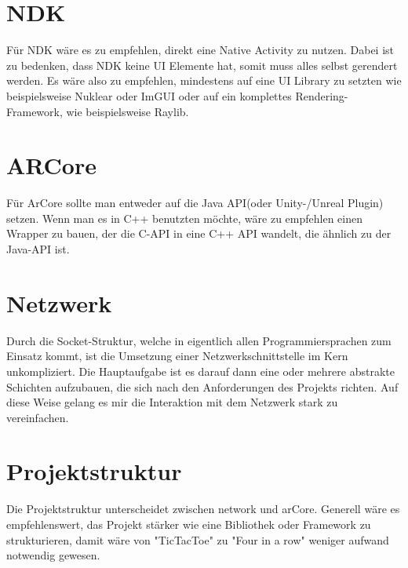 \section{NDK}
Für NDK wäre es zu empfehlen, direkt eine Native Activity zu nutzen.
Dabei ist zu bedenken, dass NDK keine UI Elemente hat, somit muss alles selbst
gerendert werden. Es wäre also zu empfehlen, mindestens auf eine UI Library zu setzten
wie beispielsweise Nuklear oder ImGUI oder auf ein komplettes Rendering-Framework,
wie beispielsweise Raylib.

\section{ARCore}
Für ArCore sollte man entweder auf die Java API(oder Unity-/Unreal Plugin) setzen.
Wenn man es in C++ benutzten möchte, wäre zu empfehlen einen Wrapper zu bauen, der die
C-API in eine C++ API wandelt, die ähnlich zu der Java-API ist.

\section{Netzwerk}
Durch die Socket-Struktur, welche in eigentlich allen Programmiersprachen zum Einsatz kommt,
ist die Umsetzung einer Netzwerkschnittstelle im Kern unkompliziert. Die Hauptaufgabe ist es darauf
dann eine oder mehrere abstrakte Schichten aufzubauen, die sich nach den Anforderungen des Projekts
richten. Auf diese Weise gelang es mir die Interaktion mit dem Netzwerk stark zu vereinfachen.

\section{Projektstruktur}
Die Projektstruktur unterscheidet zwischen network und arCore. Generell wäre es empfehlenswert, das Projekt stärker wie eine Bibliothek oder Framework zu strukturieren, damit wäre von "TicTacToe" zu "Four in a row" weniger aufwand notwendig gewesen.